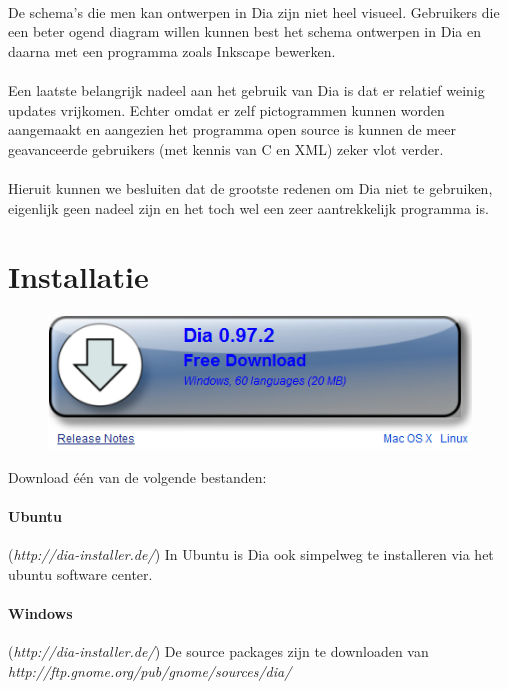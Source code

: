 \documentclass[12pt,a4paper]{report}
\begin{document}
\begin{flushleft}
\paragraph*{} 
De schema's die men kan ontwerpen in Dia zijn niet heel visueel. Gebruikers die een beter ogend diagram willen kunnen best het schema ontwerpen in Dia en daarna met een programma zoals Inkscape bewerken. 
\paragraph*{}
Een laatste belangrijk nadeel aan het gebruik van Dia is dat er relatief weinig updates vrijkomen. Echter omdat er zelf pictogrammen kunnen worden aangemaakt en aangezien het programma open source is kunnen de meer geavanceerde gebruikers (met kennis van C en XML) zeker vlot verder.
\paragraph*{}
Hieruit kunnen we besluiten dat de grootste redenen om Dia niet te gebruiken, eigenlijk geen nadeel zijn en het toch wel een zeer aantrekkelijk programma is.
\section{Installatie}
\begin{figure}[H]
\includegraphics[scale=0.5]{images/install_01.png} 
\end{figure}
Download \'e\'en van de volgende bestanden:
\paragraph*{Ubuntu}
(\textit{http://dia-installer.de/})\linebreak
In Ubuntu is Dia ook simpelweg te installeren via het ubuntu software center.
\paragraph*{Windows}
(\textit{http://dia-installer.de/})\linebreak
De source packages zijn te downloaden van \textit{http://ftp.gnome.org/pub/gnome/sources/dia/}

\end{flushleft}
\end{document}
